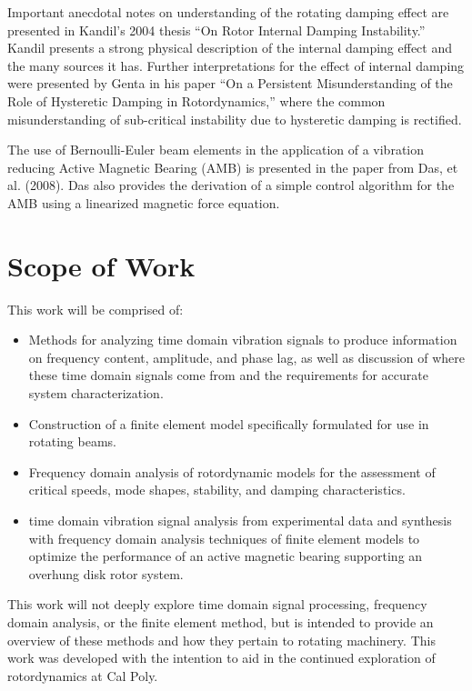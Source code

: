Important anecdotal notes on understanding of the rotating damping effect are presented in Kandil's 2004\cite{kandil2005rotor} thesis ``On Rotor Internal Damping Instability.'' Kandil presents a strong physical description of the internal damping effect and the many sources it has. Further interpretations for the effect of internal damping were presented by Genta in his paper ``On a Persistent Misunderstanding of the Role of Hysteretic Damping in Rotordynamics,'' where the common misunderstanding of sub-critical instability due to hysteretic damping is rectified.\par 
The use of Bernoulli-Euler beam elements in the application of a vibration reducing Active Magnetic Bearing (AMB) is presented in the paper from Das, et al. (2008\cite{das2008vibration}). Das also provides the derivation of a simple control algorithm for the AMB using a linearized magnetic force equation.\par
\section{Scope of Work}
This work will be comprised of: 
\begin{itemize}
	\item Methods for analyzing time domain vibration signals to produce information on frequency content, amplitude, and phase lag, as well as discussion of where these time domain signals come from and the requirements for accurate system characterization.
	\item Construction of a finite element model specifically formulated for use in rotating beams.
	\item Frequency domain analysis of rotordynamic models for the assessment of critical speeds, mode shapes, stability, and damping characteristics.
	\item time domain vibration signal analysis from experimental data and synthesis with frequency domain analysis techniques of finite element models to optimize the performance of an active magnetic bearing supporting an overhung disk rotor system.
\end{itemize}
This work will not deeply explore time domain signal processing, frequency domain analysis, or the finite element method, but is intended to provide an overview of these methods and how they pertain to rotating machinery. This work was developed with the intention to aid in the continued exploration of rotordynamics at Cal Poly.\par